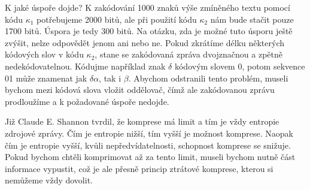 K jaké úspoře dojde? K zakódování 1000 znaků výše zmíněného textu pomocí kódu $\kappa_1$ potřebujeme 2000 bitů, ale při použití kódu $\kappa_2$ nám bude stačit pouze 1700 bitů. Úspora je tedy 300 bitů. Na otázku, zda je možné tuto úsporu ještě zvýšit, nelze odpovědět jenom ani nebo ne. Pokud zkrátíme délku některých kódových slov v kódu $\kappa_2$, stane se zakódovaná zpráva dvojznačnou a zpětně nedekódovatelnou. Kódujme například znak $\delta$ kódovým slovem 0, potom sekvence 01 může znamenat jak $\delta\alpha$, tak i $\beta$. Abychom odstranili tento problém, museli bychom mezi kódová slova vložit oddělovač, čímž ale zakódovanou zprávu prodloužíme a k požadované úspoře nedojde.

Již Claude E. Shannon tvrdil, že komprese má limit a tím je vždy entropie zdrojové zprávy. Čím je entropie nižší, tím vyšší je možnost komprese. Naopak čím je entropie vyšší, kvůli nepředvídatelnosti, schopnost komprese se snižuje. Pokud bychom chtěli komprimovat až za tento limit, museli bychom nutně část informace vypustit, což je ale přesně princip ztrátové komprese, kterou si nemůžeme vždy dovolit.